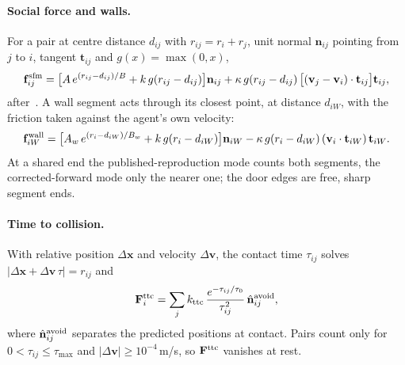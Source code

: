 \paragraph{Social force and walls.}
For a pair at centre distance $d_{ij}$ with $r_{ij}=r_i+r_j$, unit normal $\mathbf n_{ij}$ pointing from $j$ to $i$, tangent $\mathbf t_{ij}$ and $g(x)=\max(0,x)$,
\begin{equation}\label{eq:sfm}
\mathbf f^{\rm sfm}_{ij}=\bigl[A\,e^{(r_{ij}-d_{ij})/B}+k\,g(r_{ij}-d_{ij})\bigr]\mathbf n_{ij}+\kappa\,g(r_{ij}-d_{ij})\,\bigl[(\mathbf v_j-\mathbf v_i)\cdot\mathbf t_{ij}\bigr]\mathbf t_{ij},
\end{equation}
after~\cite{helbing2000nature}. A wall segment acts through its closest point, at distance $d_{iW}$, with the friction taken against the agent's own velocity:
\begin{equation}\label{eq:wall}
\mathbf f^{\rm wall}_{iW}=\bigl[A_w\,e^{(r_i-d_{iW})/B_w}+k\,g(r_i-d_{iW})\bigr]\mathbf n_{iW}-\kappa\,g(r_i-d_{iW})\,(\mathbf v_i\cdot\mathbf t_{iW})\,\mathbf t_{iW}.
\end{equation}
At a shared end the published-reproduction mode counts both segments, the corrected-forward mode only the nearer one; the door edges are free, sharp segment ends.

\paragraph{Time to collision.}
With relative position $\Delta\mathbf x$ and velocity $\Delta\mathbf v$, the contact time $\tau_{ij}$ solves $|\Delta\mathbf x+\Delta\mathbf v\,\tau|=r_{ij}$ and
\begin{equation}\label{eq:ttc}
\mathbf F^{\rm ttc}_i=\sum_j k_{\rm ttc}\,\frac{e^{-\tau_{ij}/\tau_0}}{\tau_{ij}^2}\,\hat{\mathbf n}^{\rm avoid}_{ij},
\end{equation}
where $\hat{\mathbf n}^{\rm avoid}_{ij}$ separates the predicted positions at contact. Pairs count only for $0<\tau_{ij}\le\tau_{\max}$ and $|\Delta\mathbf v|\ge10^{-4}$\,m/s, so $\mathbf F^{\rm ttc}$ vanishes at rest.


